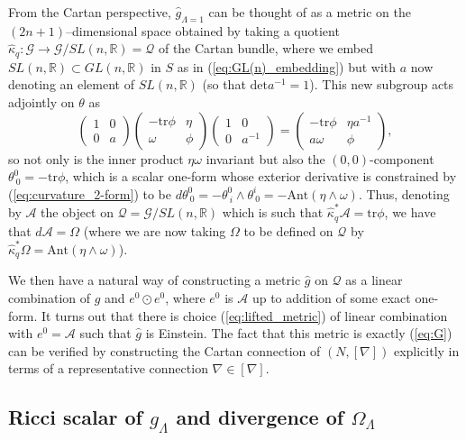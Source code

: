From the Cartan perspective, $\hat{g}_{\Lambda=1}$ can be thought
of as a metric on the $(2n+1)$--dimensional space obtained by taking
a quotient $\hat{\kappa}_q:\mathcal{G}\rightarrow \mathcal{G}/SL(n,\mathbb{R})=\mathcal{Q}$ of the Cartan
bundle, where we embed $SL(n,\mathbb{R})\subset GL(n,\mathbb{R})$
in $S$ as in (\ref{eq:GL(n)_embedding}) but with $a$ now denoting
an element of $SL(n,\mathbb{R})$ (so that $\mathrm{det}a^{-1}=1$).
This new subgroup acts adjointly on $\theta$ as
\[
\begin{pmatrix}1 & 0\\
0 & a
\end{pmatrix}\begin{pmatrix}-\mathrm{tr}\phi & \eta\\
\omega & \phi
\end{pmatrix}\begin{pmatrix}1 & 0\\
0 & a^{-1}
\end{pmatrix}=\begin{pmatrix}-\mathrm{tr}\phi & \eta a^{-1}\\
a\omega & \phi
\end{pmatrix},
\]
so not only is the inner product $\eta\omega$ invariant but also
the $(0,0)$-component $\theta_{\ 0}^{0}=\mathrm{-tr}\phi$, which
is a scalar one-form whose exterior derivative is constrained by (\ref{eq:curvature_2-form}) to be $ d\theta_{\ 0}^{0}=-\theta_{\ i}^{0}\wedge\theta_{\ 0}^{i}=-\mathrm{Ant}(\eta\wedge\omega)$.
Thus, denoting by $\mathcal{A}$ the object on $\mathcal{Q}=\mathcal{G}/SL(n,\mathbb{R})$
which is such that $\hat{\kappa}_q^{*}\mathcal{A}=\mathrm{tr}\phi$, we have that
$ d\mathcal{A}=\Omega$ (where we are now taking $\Omega$ to be defined on $\mathcal{Q}$ by $\hat{\kappa}_q^{*}\Omega=\mathrm{Ant}(\eta\wedge\omega)$).

We then have a natural way of constructing a metric $\hat{g}$
on $\mathcal{Q}$ as a linear combination of $g$ and $e^{0}\odot e^{0}$,
where $e^{0}$ is $\mathcal{A}$ up to addition of some exact one-form. It turns
out that there is choice (\ref{eq:lifted_metric}) of linear combination with $e^0=\mathcal{A}$ such that $\hat{g}$
is Einstein. The fact that this metric is exactly (\ref{eq:G}) can be verified
by constructing the Cartan connection of $(N,[\nabla])$ explicitly
in terms of a representative connection $\nabla\in[\nabla]$.

\subsection{Ricci scalar of $g_\Lambda$ and divergence of $\Omega_\Lambda$}

